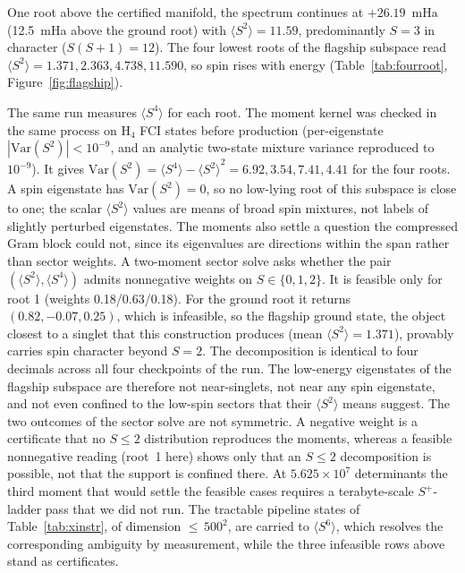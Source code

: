 \documentclass[11pt]{article}
\newcommand{\ssq}{\ensuremath{\langle S^2\rangle}}
\begin{document}
One root above the certified manifold, the spectrum continues at $+26.19$~mHa (12.5~mHa above the ground root) with $\ssq = 11.59$, predominantly $S = 3$ in character ($S(S+1) = 12$). The four lowest roots of the flagship subspace read $\ssq = 1.371, 2.363, 4.738, 11.590$, so spin rises with energy (Table~\ref{tab:fourroot}, Figure~\ref{fig:flagship}).

The same run measures $\langle S^4\rangle$ for each root. The moment kernel was checked in the same process on H$_4$ FCI states before production (per-eigenstate $|\mathrm{Var}(S^2)| < 10^{-9}$, and an analytic two-state mixture variance reproduced to $10^{-9}$). It gives $\mathrm{Var}(S^2) = \langle S^4\rangle - \ssq^2 = 6.92, 3.54, 7.41, 4.41$ for the four roots. A spin eigenstate has $\mathrm{Var}(S^2) = 0$, so no low-lying root of this subspace is close to one; the scalar \ssq{} values are means of broad spin mixtures, not labels of slightly perturbed eigenstates. The moments also settle a question the compressed Gram block could not, since its eigenvalues are directions within the span rather than sector weights. A two-moment sector solve asks whether the pair $(\ssq, \langle S^4\rangle)$ admits nonnegative weights on $S \in \{0, 1, 2\}$. It is feasible only for root 1 (weights 0.18/0.63/0.18). For the ground root it returns $(0.82, -0.07, 0.25)$, which is infeasible, so the flagship ground state, the object closest to a singlet that this construction produces (mean $\ssq = 1.371$), provably carries spin character beyond $S = 2$. The decomposition is identical to four decimals across all four checkpoints of the run. The low-energy eigenstates of the flagship subspace are therefore not near-singlets, not near any spin eigenstate, and not even confined to the low-spin sectors that their \ssq{} means suggest. The two outcomes of the sector solve are not symmetric. A negative weight is a certificate that no $S\le2$ distribution reproduces the moments, whereas a feasible nonnegative reading (root~1 here) shows only that an $S\le2$ decomposition is possible, not that the support is confined there. At $5.625\times10^7$ determinants the third moment that would settle the feasible cases requires a terabyte-scale $S^+$-ladder pass that we did not run. The tractable pipeline states of Table~\ref{tab:xinstr}, of dimension ${\le}\,500^2$, are carried to $\langle S^6\rangle$, which resolves the corresponding ambiguity by measurement, while the three infeasible rows above stand as certificates.
\end{document}
